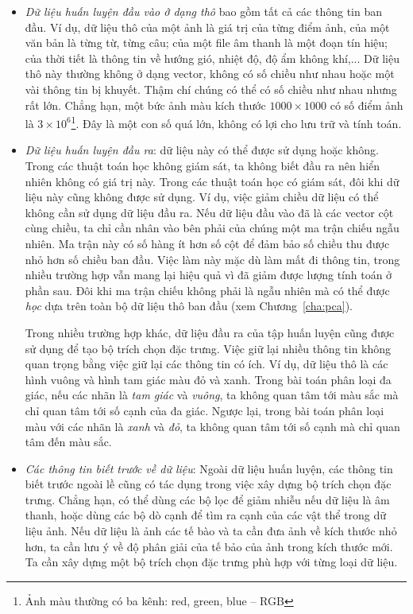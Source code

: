 \begin{itemize}
    \item \textit{Dữ liệu huấn luyện đầu vào ở dạng thô} bao gồm tất cả các thông tin ban đầu. Ví dụ, dữ liệu thô của một ảnh là
    giá trị của từng điểm ảnh, của một văn bản là từng từ, từng câu; của một
    file âm thanh là một đoạn tín hiệu; của thời tiết là thông tin về hướng gió,
    nhiệt độ, độ ẩm không khí,... Dữ liệu thô này thường không ở dạng vector,
    không có số chiều như nhau hoặc một vài thông tin bị khuyết. Thậm chí chúng
    có thể có số chiều như nhau nhưng rất lớn. Chẳng hạn, một bức ảnh màu kích
    thước $1000\times 1000$ có số điểm ảnh là $3 \times 10^6$\footnote{Ảnh màu
    thường có ba kênh: red, green, blue -- RGB}. Đây là một con số quá lớn, không có lợi cho lưu
    trữ và tính toán.

    \item \textit{Dữ liệu huấn luyện đầu ra}: dữ liệu này có thể được sử dụng
    hoặc không. Trong các thuật toán học không giám sát, ta không biết đầu ra
    nên hiển nhiên không có giá trị này. Trong các thuật toán học có giám sát,
    đôi khi dữ liệu này cũng không được sử dụng. Ví dụ, việc giảm chiều dữ liệu
    có thể không cần sử dụng dữ liệu đầu ra. Nếu dữ liệu đầu vào đã là các
    vector cột cùng chiều, ta chỉ cần nhân vào bên phải của chúng một ma trận
    chiếu ngẫu nhiên. Ma trận này có số hàng ít hơn số cột để đảm bảo số chiều
    thu được nhỏ hơn số chiều ban đầu. Việc làm này mặc dù làm mất đi thông tin,
    trong nhiều trường hợp vẫn mang lại hiệu quả vì đã giảm được lượng tính toán
    ở phần sau. Đôi khi {ma trận chiếu} không phải là ngẫu nhiên mà có thể được
    \textit{học} dựa trên toàn bộ dữ liệu thô ban đầu (xem Chương~\ref{cha:pca}).

    Trong nhiều trường hợp khác, dữ liệu đầu ra của tập huấn luyện cũng được sử
    dụng để tạo bộ trích chọn đặc trưng. Việc giữ lại
    nhiều thông tin không quan trọng bằng việc giữ lại các thông tin có ích. Ví dụ, dữ liệu thô là các hình vuông và hình tam giác màu đỏ và xanh.
    Trong bài toán phân loại đa giác, nếu các nhãn là \textit{tam giác} và
    \textit{vuông}, ta không quan tâm tới màu sắc mà chỉ quan tâm tới số cạnh
    của đa giác. Ngược lại, trong bài toán phân loại màu với các nhãn là
    \textit{xanh} và \textit{đỏ}, ta không quan tâm tới số cạnh mà chỉ quan tâm
    đến màu sắc.

    \item \textit{Các thông tin biết trước về dữ liệu}: Ngoài dữ liệu huấn luyện, các thông tin biết trước ngoài lề cũng có tác dụng trong việc xây dựng bộ trích chọn đặc trưng. Chẳng hạn, có thể dùng các bộ lọc để giảm nhiễu nếu dữ liệu là âm thanh, hoặc dùng các bộ dò cạnh để tìm ra cạnh của các vật thể trong dữ liệu ảnh. Nếu dữ liệu là ảnh các tế bào và ta cần đưa ảnh về kích thước nhỏ hơn, ta cần lưu ý về độ phân giải của tế bảo của ảnh trong kích thước mới. Ta cần xây dựng một bộ trích chọn đặc trưng phù hợp với từng loại dữ liệu. 
\end{itemize}

